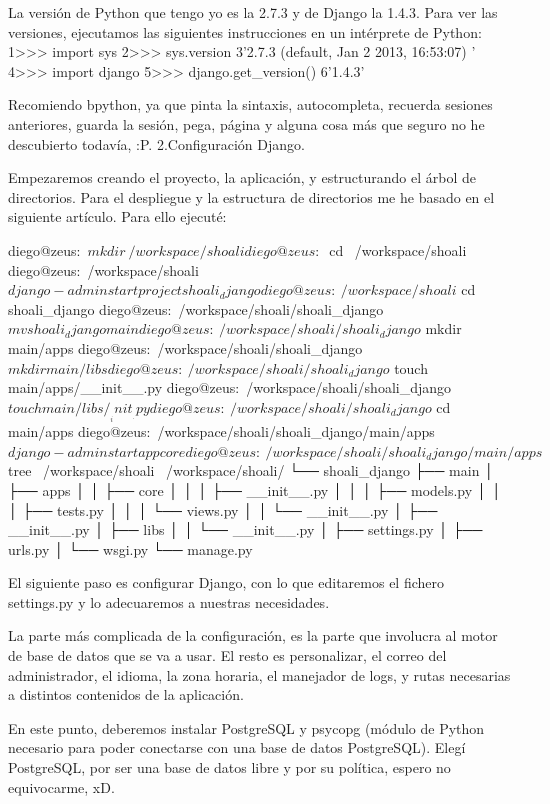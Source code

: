 \documentclass[a4paper, 12pt]{book}
\begin{document}
La versión de Python que tengo yo es la 2.7.3 y de Django la 1.4.3. Para ver las versiones, ejecutamos las siguientes instrucciones en un intérprete de Python:
1>>> import sys
2>>> sys.version
3'2.7.3 (default, Jan  2 2013, 16:53:07) \n[GCC 4.7.2]'
4>>> import django
5>>> django.get_version()
6'1.4.3'

Recomiendo bpython, ya que pinta la sintaxis, autocompleta, recuerda sesiones anteriores, guarda la sesión, pega, página y alguna cosa más que seguro no he descubierto todavía, :P.
2.Configuración Django.

Empezaremos creando el proyecto, la aplicación, y estructurando el árbol de directorios. Para el despliegue y la estructura de directorios me he basado en el siguiente artículo. Para ello ejecuté:

diego@zeus:~$ mkdir ~/workspace/shoali
diego@zeus:~$ cd ~/workspace/shoali
diego@zeus:~/workspace/shoali$ django-admin startproject shoali_django
diego@zeus:~/workspace/shoali$ cd shoali_django
diego@zeus:~/workspace/shoali/shoali_django$ mv shoali_django main
diego@zeus:~/workspace/shoali/shoali_django$ mkdir main/apps
diego@zeus:~/workspace/shoali/shoali_django$ mkdir main/libs
diego@zeus:~/workspace/shoali/shoali_django$ touch main/apps/__init__.py
diego@zeus:~/workspace/shoali/shoali_django$ touch main/libs/__init__.py
diego@zeus:~/workspace/shoali/shoali_django$ cd main/apps
diego@zeus:~/workspace/shoali/shoali_django/main/apps$ django-admin startapp core
diego@zeus:~/workspace/shoali/shoali_django/main/apps$ tree ~/workspace/shoali
~/workspace/shoali/
└── shoali_django
├── main
│   ├── apps
│   │   ├── core
│   │   │   ├── __init__.py
│   │   │   ├── models.py
│   │   │   ├── tests.py
│   │   │   └── views.py
│   │   └── __init__.py
│   ├── __init__.py
│   ├── libs
│   │   └── __init__.py
│   ├── settings.py
│   ├── urls.py
│   └── wsgi.py
└── manage.py

El siguiente paso es configurar Django, con lo que editaremos el fichero settings.py y lo adecuaremos a nuestras necesidades.

La parte más complicada de la configuración, es la parte que involucra al motor de base de datos que se va a usar. El resto es personalizar, el correo del administrador, el idioma, la zona horaria, el manejador de logs, y rutas necesarias a distintos contenidos de la aplicación.

En este punto, deberemos instalar PostgreSQL y psycopg (módulo de Python necesario para poder conectarse con una base de datos PostgreSQL). Elegí PostgreSQL, por ser una base de datos libre y por su política, espero no equivocarme, xD.
\end{document}

